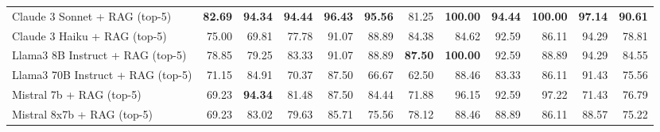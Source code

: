 \begin{table}[H]
{\begin{tabular}{lrrrrrrrrrrr}
\rowcolor{Gray}
Claude 3 Sonnet + RAG (top-5) & \textbf{82.69} & \textbf{94.34} & \textbf{94.44} & \textbf{96.43} & \textbf{95.56} & 81.25 & \textbf{100.00} & \textbf{94.44} & \textbf{100.00} & \textbf{97.14} & \textbf{90.61} \\
\rowcolor{Gray}
Claude 3 Haiku + RAG (top-5) & 75.00 & 69.81 & 77.78 & 91.07 & 88.89 & 84.38 & 84.62 & 92.59 & 86.11 & 94.29 & 78.81 \\
\rowcolor{Gray}
Llama3 8B Instruct + RAG (top-5) & 78.85 & 79.25 & 83.33 & 91.07 & 88.89 & \textbf{87.50} & \textbf{100.00} & 92.59 & 88.89 & 94.29 & 84.55 \\
\rowcolor{Gray}
Llama3 70B Instruct + RAG (top-5) & 71.15 & 84.91 & 70.37 & 87.50 & 66.67 & 62.50 & 88.46 & 83.33 & 86.11 & 91.43 & 75.56 \\
\rowcolor{Gray}
Mistral 7b + RAG (top-5) & 69.23 & \textbf{94.34} & 81.48 & 87.50 & 84.44 & 71.88 & 96.15 & 92.59 & 97.22 & 71.43 & 76.79 \\
\rowcolor{Gray}
Mistral 8x7b + RAG (top-5) & 69.23 & 83.02 & 79.63 & 85.71 & 75.56 & 78.12 & 88.46 & 88.89 & 86.11 & 88.57 & 75.22 \\
\bottomrule
\end{tabular}
}
 \label{tab:implicit_20topics_10}
\end{table}


